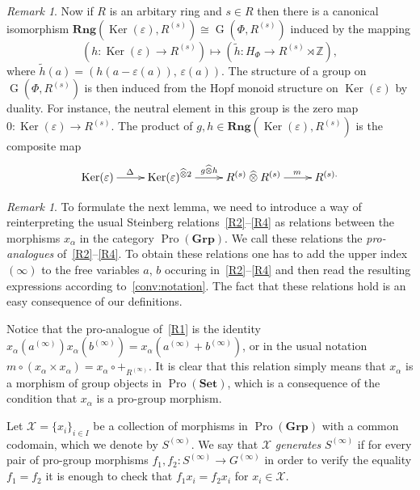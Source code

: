 \documentclass[oneside, 11pt]{amsart}
\numberwithin{equation}{section}
\theoremstyle{definition}
\theoremstyle{remark}
\newtheorem{rem}[lemma]{Remark}
\DeclareMathOperator\Ker{Ker}
\DeclareMathOperator\GG{G}
\DeclareMathOperator{\Pro}{Pro}
\newcommand{\Set}{\mathbf{Set}}
\newcommand{\Group}{\mathbf{Grp}}
\newcommand{\Rng}{\mathbf{Rng}}
\newcommand{\ZZ}{\mathbb{Z}}
\newcommand{\otimeshat}{\mathbin{\widehat{\otimes}}}
\begin{document}
\begin{rem}
 Now if $R$ is an arbitary ring and $s \in R$ then there is a canonical isomorphism \(\Rng(\Ker(\varepsilon), R^{(s)}) \cong \GG(\Phi, R^{(s)})\) induced by the mapping 
 \[(h \colon \Ker(\varepsilon) \to R^{(s)}) \mapsto (\widetilde{h} \colon H_\Phi \to R^{(s)}\rtimes\ZZ), \]
 where $\widetilde{h}(a) = \left(h(a - \varepsilon(a)),\, \varepsilon(a)\right)$.
 The structure of a group on $\GG(\Phi, R^{(s)})$ is then induced from the Hopf monoid structure on $\Ker(\varepsilon)$ by duality.
 For instance, the neutral element in this group is the zero map \(0 \colon \Ker(\varepsilon) \to R^{(s)}\). The product of \(g, h \in \Rng(\Ker(\varepsilon), R^{(s)})\) is the composite map
 \[ \xymatrix{ \Ker(\varepsilon) \ar[r]^(0.45){\Delta} & \Ker(\varepsilon) ^{\otimeshat 2} \ar[r]^(0.47){g \otimeshat h} & R^{(s)} \otimeshat R^{(s)} \ar[r]^(0.6){m} & R^{(s).}} \]
\end{rem}

\begin{rem}
 To formulate the next lemma, we need to introduce a way of reinterpreting the usual Steinberg relations~\eqref{R2}--\eqref{R4} as relations between the morphisms $x_\alpha$ in the category $\Pro(\Group)$. We call these relations the {\it pro-analogues} of~\eqref{R2}--\eqref{R4}. To obtain these relations one has to add the upper index $(\infty)$ to the free variables $a$, $b$ occuring in~\eqref{R2}--\eqref{R4} and then read the resulting expressions according to~\cref{conv:notation}. The fact that these relations hold is an easy consequence of our definitions.
 
 Notice that the pro-analogue of~\eqref{R1} is the identity $x_\alpha(a^{(\infty)}) x_\alpha(b^{(\infty)}) = x_\alpha(a^{(\infty)} + b^{(\infty)})$, or in the usual notation $m \circ (x_\alpha \times x_\alpha) = x_\alpha \circ +_{R^{(\infty)}}$. It is clear that this relation simply means that $x_\alpha$ is a morphism of group objects in $\Pro(\Set)$, which is a consequence of the condition that $x_\alpha$ is a pro-group morphism.
\end{rem}

Let $\mathcal{X} = \{ x_i \}_{i \in I}$ be a collection of morphisms in $\Pro(\Group)$ with a common codomain, which we denote by $S^{(\infty)}$. We say that $\mathcal{X}$ {\it generates} $S^{(\infty)}$ if for every pair of pro-group morphisms $f_1, f_2 \colon S^{(\infty)} \to G^{(\infty)}$ in order to verify the equality $f_1 = f_2$ it is enough to check that $f_1 x_i = f_2 x_i$ for $x_i \in \mathcal{X}$. 
\end{document}
